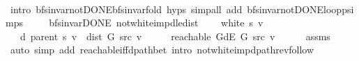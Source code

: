 \begin{isabellebody}
\ \ \ \ \ \ \isamarkupfalse%
\ {\isacharparenleft}{\kern0pt}intro\ bfs{\isacharunderscore}{\kern0pt}invar{\isacharunderscore}{\kern0pt}not{\isacharunderscore}{\kern0pt}DONE{\isachardot}{\kern0pt}bfs{\isacharunderscore}{\kern0pt}invar{\isacharunderscore}{\kern0pt}fold\ {\isachardoublequoteopen}{}{\isachardot}{\kern0pt}hyps{\isachardoublequoteclose}{\isacharparenright}{\kern0pt}\ {\isacharparenleft}{\kern0pt}simp{\isacharunderscore}{\kern0pt}all\ add{\isacharcolon}{\kern0pt}\ bfs{\isacharunderscore}{\kern0pt}invar{\isacharunderscore}{\kern0pt}not{\isacharunderscore}{\kern0pt}DONE{\isachardot}{\kern0pt}loop{\isacharunderscore}{\kern0pt}psimps{\isacharparenright}{\kern0pt}\isanewline
\ \ \isamarkupfalse%
\isanewline
{}\isamarkupfalse%
%
\endisatagproof
{\isafoldproof}%
%
\isadelimproof
%
\endisadelimproof
%
\isadelimdocument
%
\endisadelimdocument
%
\isatagdocument
%
\isamarkuptrue%
%
\endisatagdocument
{\isafolddocument}%
%
\isadelimdocument
%
\endisadelimdocument
{}\isamarkupfalse%
\ {\isacharparenleft}{\kern0pt}\ bfs{\isacharunderscore}{\kern0pt}invar{\isacharunderscore}{\kern0pt}DONE{\isacharparenright}{\kern0pt}\ not{\isacharunderscore}{\kern0pt}white{\isacharunderscore}{\kern0pt}imp{\isacharunderscore}{\kern0pt}d{\isacharunderscore}{\kern0pt}le{\isacharunderscore}{\kern0pt}dist{\isacharcolon}{\kern0pt}\isanewline
\ \ \ {\isachardoublequoteopen}{\isasymnot}\ white\ s\ v{\isachardoublequoteclose}\isanewline
\ \ \ {\isachardoublequoteopen}d\ {\isacharparenleft}{\kern0pt}parent\ s{\isacharparenright}{\kern0pt}\ v\ {\isasymle}\ dist\ G\ src\ v{\isachardoublequoteclose}\isanewline
%
\isadelimproof
%
\endisadelimproof
%
\isatagproof
{}\isamarkupfalse%
\ {\isacharminus}{\kern0pt}\isanewline
\ \ \isamarkupfalse%
\ {\isachardoublequoteopen}reachable\ {\isacharparenleft}{\kern0pt}G{\isachardot}{\kern0pt}dE\ G{\isacharparenright}{\kern0pt}\ src\ v{\isachardoublequoteclose}\isanewline
\ \ \ \ \isamarkupfalse%
\ assms\isanewline
\ \ \ \ \isamarkupfalse%
\ {\isacharparenleft}{\kern0pt}auto\ simp\ add{\isacharcolon}{\kern0pt}\ reachable{\isacharunderscore}{\kern0pt}iff{\isacharunderscore}{\kern0pt}dpath{\isacharunderscore}{\kern0pt}bet\ intro{\isacharcolon}{\kern0pt}\ not{\isacharunderscore}{\kern0pt}white{\isacharunderscore}{\kern0pt}imp{\isacharunderscore}{\kern0pt}dpath{\isacharunderscore}{\kern0pt}rev{\isacharunderscore}{\kern0pt}follow{\isacharparenright}{\kern0pt}\isanewline

\end{isabellebody}
